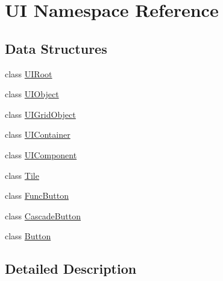 \hypertarget{namespaceUI}{\section{U\-I Namespace Reference}
\label{namespaceUI}
}
\subsection*{Data Structures}
\begin{DoxyCompactItemize}
\item 
class \hyperlink{classUI_1_1UIRoot}{U\-I\-Root}
\item 
class \hyperlink{classUI_1_1UIObject}{U\-I\-Object}
\item 
class \hyperlink{classUI_1_1UIGridObject}{U\-I\-Grid\-Object}
\item 
class \hyperlink{classUI_1_1UIContainer}{U\-I\-Container}
\item 
class \hyperlink{classUI_1_1UIComponent}{U\-I\-Component}
\item 
class \hyperlink{classUI_1_1Tile}{Tile}
\item 
class \hyperlink{classUI_1_1FuncButton}{Func\-Button}
\item 
class \hyperlink{classUI_1_1CascadeButton}{Cascade\-Button}
\item 
class \hyperlink{classUI_1_1Button}{Button}
\end{DoxyCompactItemize}


\subsection{Detailed Description}
\begin{DoxyVerb}\end{DoxyVerb}
 